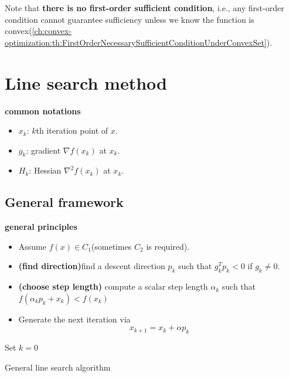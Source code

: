 \begin{refsection}
\begin{remark}
Note that \textbf{there is no first-order sufficient condition}, i.e., any first-order condition cannot guarantee sufficiency unless we know the function is  convex(\autoref{ch:convex-optimization:th:FirstOrderNecessarySufficientConditionUnderConvexSet}).
\end{remark}
 



\section{Line search method}
\begin{mdframed}
\textbf{common notations}
\begin{itemize}
	\item $x_k$: $k$th iteration point of $x$.
	\item $g_k$:  gradient $\nabla f(x_k)$ at $x_k$.
	\item $H_k$: Hessian $\nabla^2 f(x_k)$ at $x_k$.
\end{itemize}
\end{mdframed}

\subsection{General framework}
\begin{mdframed}
\textbf{general principles}\\
\begin{itemize}
	\item Assume $f(x)\in C_1$(sometimes $C_2$ is required).
	\item \textbf{(find direction)}find a descent direction $p_k$ such that $g^T_k p_k < 0$ if $g_k \neq 0$.
	\item \textbf{(choose step length)} compute a scalar step length $\alpha_k$ such that $f(\alpha_k p_k + x_k) < f(x_k)$
	\item Generate the next iteration via
	$$x_{k+1} = x_k + \alpha p_k$$
\end{itemize}
\end{mdframed}

\begin{algorithm}[H]
	\SetAlgoLined
	Set $k = 0$
	\caption{General line search algorithm}
\end{algorithm}



\end{refsection}
